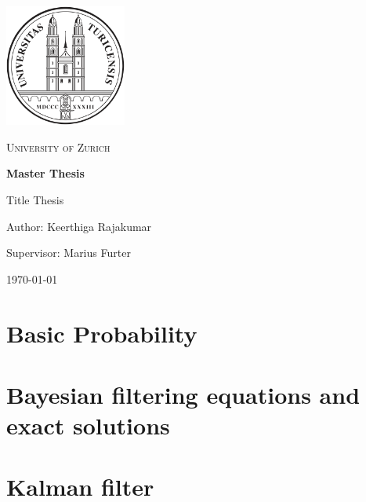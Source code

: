 \documentclass[twoside]{article}
\theoremstyle{plain} %
\theoremstyle{definition} %
\theoremstyle{remark} %
\begin{document}
\begin{titlepage}
    \centering
    \includegraphics[width=0.3\textwidth]{Figures/Uni_Zuerich_Siegel.svg.png}\par\vspace{1cm}
    {\scshape\LARGE University of Zurich \par}
    \vspace{1.5cm}
    {\huge\bfseries Master Thesis \par}
    \vspace{1cm}
    {\Large Title Thesis \par}
    \vspace{2cm}
    {\large Author: Keerthiga Rajakumar \par}
    \vspace{0.5cm}
    {\large Supervisor: Marius Furter \par}
    \vfill
    {\large \today\par}
    \date{\today}

\end{titlepage}


\tableofcontents
\cleardoublepage


\setcounter{page}{1}


\section{Basic Probability}



\newpage
\section{Bayesian filtering equations and exact solutions}



\newpage
\section{Kalman filter}

\end{document}
